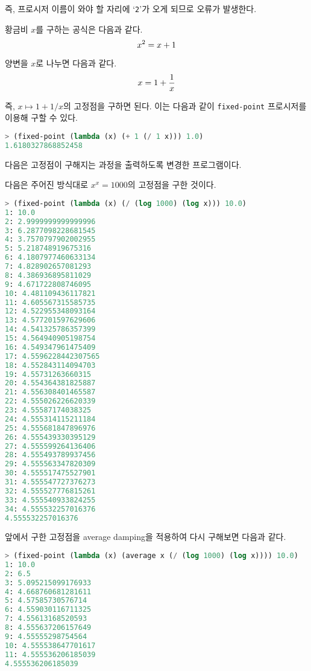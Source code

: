 즉, 프로시저 이름이 와야 할 자리에 `\texttt{2}'가 오게 되므로 오류가 발생한다.

황금비 $x$를 구하는 공식은 다음과 같다.
\begin{equation}\notag
  x^2 = x + 1
\end{equation}

양변을 $x$로 나누면 다음과 같다.
\begin{equation}\notag
  x = 1 + \frac{1}{x}
\end{equation}

즉, $x \mapsto 1 + 1/x$의 고정점을 구하면 된다. 이는 다음과 같이
\texttt{fixed-point} 프로시저를 이용해 구할 수 있다.

\begin{lstlisting}[language=Scheme]
> (fixed-point (lambda (x) (+ 1 (/ 1 x))) 1.0)
1.6180327868852458
\end{lstlisting}


다음은 고정점이 구해지는 과정을 출력하도록 변경한 프로그램이다.

다음은 주어진 방식대로 $x^x=1000$의 고정점을 구한 것이다.

\begin{lstlisting}[language=Scheme]
> (fixed-point (lambda (x) (/ (log 1000) (log x))) 10.0)
1: 10.0
2: 2.9999999999999996
3: 6.2877098228681545
4: 3.7570797902002955
5: 5.218748919675316
6: 4.1807977460633134
7: 4.828902657081293
8: 4.386936895811029
9: 4.671722808746095
10: 4.481109436117821
11: 4.605567315585735
12: 4.522955348093164
13: 4.577201597629606
14: 4.541325786357399
15: 4.564940905198754
16: 4.549347961475409
17: 4.5596228442307565
18: 4.552843114094703
19: 4.55731263660315
20: 4.554364381825887
21: 4.556308401465587
22: 4.555026226620339
23: 4.55587174038325
24: 4.555314115211184
25: 4.555681847896976
26: 4.555439330395129
27: 4.555599264136406
28: 4.555493789937456
29: 4.555563347820309
30: 4.555517475527901
31: 4.555547727376273
32: 4.555527776815261
33: 4.555540933824255
34: 4.555532257016376
4.555532257016376
\end{lstlisting}

앞에서 구한 고정점을 average damping을 적용하여 다시 구해보면 다음과 같다.
\begin{lstlisting}[language=Scheme]
> (fixed-point (lambda (x) (average x (/ (log 1000) (log x)))) 10.0)
1: 10.0
2: 6.5
3: 5.095215099176933
4: 4.668760681281611
5: 4.57585730576714
6: 4.559030116711325
7: 4.55613168520593
8: 4.555637206157649
9: 4.55555298754564
10: 4.555538647701617
11: 4.555536206185039
4.555536206185039
\end{lstlisting}


